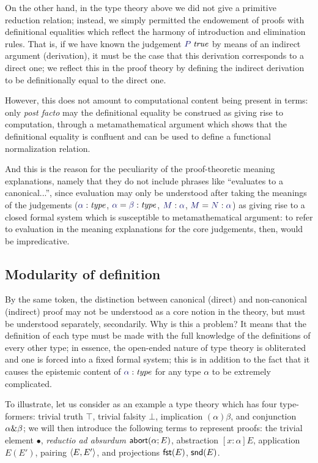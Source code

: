 On the other hand, in the type theory above we did not give a
primitive reduction relation; instead, we simply permitted the
endowement of proofs with definitional equalities which reflect the
harmony of introduction and elimination rules. That is, if we have
known the judgement $\istrue{P}$ by means of an indirect argument
(derivation), it must be the case that this derivation corresponds to
a direct one; we reflect this in the proof theory by defining the
indirect derivation to be definitionally equal to the direct one.

However, this does not amount to computational content being present in terms:
only \emph{post facto} may the definitional equality be construed as giving
rise to computation, through a metamathematical argument which shows that the
definitional equality is confluent and can be used to define a functional
normalization relation.

And this is the reason for the peculiarity of the proof-theoretic
meaning explanations, namely that they do not include phrases like
``evaluates to a canonical...'', since evaluation may only be
understood after taking the meanings of the judgements ($\type\alpha$,
$\etype{\alpha}{\beta}$, $\ofty{M}{\alpha}$, $\eofty{M}{N}{\alpha}$) as giving rise to a
closed formal system which is susceptible to metamathematical
argument: to refer to evaluation in the meaning explanations for the
core judgements, then, would be impredicative.

\subsection{Modularity of definition}

By the same token, the distinction between canonical (direct) and non-canonical
(indirect) proof may not be understood as a core notion in the theory, but must
be understood separately, secondarily. Why is this a problem? It means that the
definition of each type must be made with the full knowledge of the definitions
of every other type; in essence, the open-ended nature of type theory is
obliterated and one is forced into a fixed formal system; this is in addition
to the fact that it causes the epistemic content of $\type\alpha$ for any type
$\alpha$ to be extremely complicated.

To illustrate, let us consider as an example a type theory which has
four type-formers: trivial truth $\top$, trivial falsity $\bot$,
implication $(\alpha)\beta$, and conjunction $\alpha\&\beta$; we
will then introduce the following terms to represent proofs: the
trivial element $\bullet$, \emph{reductio ad absurdum}
$\mathsf{abort}(\alpha;E)$, abstraction $[x:\alpha]E$, application $E(E')$,
pairing $\langle E,E'\rangle$, and projections $\mathsf{fst}(E)$, $\mathsf{snd}(E)$.

